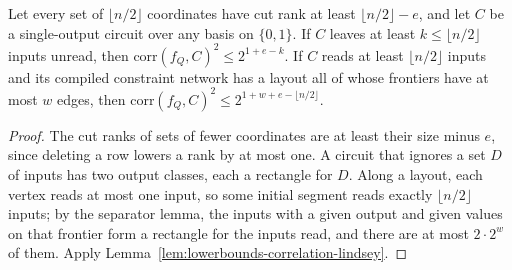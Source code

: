 \begin{theorem}
  \label{thm:lowerbounds-correlation-finite}
  \leanok
  Let every set of $\lfloor n/2\rfloor$ coordinates have cut rank at least
  $\lfloor n/2\rfloor-e$, and let $C$ be a single-output circuit over any basis on
  $\{0,1\}$. If $C$ leaves at least $k\le\lfloor n/2\rfloor$ inputs unread, then
  $\mathrm{corr}(f_Q,C)^2\le2^{1+e-k}$. If $C$ reads at least $\lfloor n/2\rfloor$
  inputs and its compiled constraint network has a layout all of whose frontiers
  have at most $w$ edges, then $\mathrm{corr}(f_Q,C)^2\le2^{1+w+e-\lfloor n/2\rfloor}$.
\end{theorem}
\begin{proof}
  \leanok
  The cut ranks of sets of fewer coordinates are at least their size minus $e$,
  since deleting a row lowers a rank by at most one. A circuit that ignores a set
  $D$ of inputs has two output classes, each a rectangle for $D$. Along a layout,
  each vertex reads at most one input, so some initial segment reads exactly
  $\lfloor n/2\rfloor$ inputs; by the separator lemma, the inputs with a given
  output and given values on that frontier form a rectangle for the inputs read,
  and there are at most $2\cdot2^w$ of them. Apply
  Lemma~\ref{lem:lowerbounds-correlation-lindsey}.
\end{proof}

